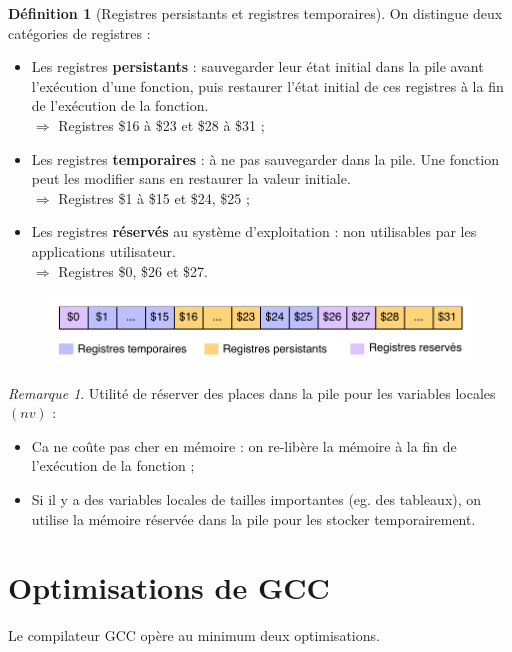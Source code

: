 \documentclass[11pt,english,french]{scrreprt}
\theoremstyle{remark}
\newtheorem*{rem*}{Remarque}
\theoremstyle{definition}
\newtheorem*{def*}{Définition}
\begin{document}
\begin{def*}[Registres persistants et registres temporaires]
	On distingue deux catégories de registres :\begin{itemize}
		\item Les registres \textbf{persistants} : sauvegarder leur état initial dans la pile avant l'exécution d'une fonction, puis restaurer l'état initial de ces registres à la fin de l'exécution de la fonction.\\
		$\Rightarrow$ Registres \$16 à \$23 et \$28 à \$31 ;
		\item Les registres \textbf{temporaires} : à ne pas sauvegarder dans la pile. Une fonction peut les modifier sans en restaurer la valeur initiale.\\
		$\Rightarrow$ Registres \$1 à \$15 et \$24, \$25 ;
		\item Les registres \textbf{réservés} au système d'exploitation : non utilisables par les applications utilisateur.\\
		$\Rightarrow$ Registres \$0, \$26 et \$27.
	\end{itemize}
	\begin{figure}[!h]
		\vspace{-10pt}
		\center
		\includegraphics[scale=.5]{diagrammes/registres}
		\vspace{-15pt}
	\end{figure}
\end{def*}

\begin{rem*}
	Utilité de réserver des places dans la pile pour les variables locales $(nv)$ :\begin{itemize}
		\item Ca ne coûte pas cher en mémoire : on re-libère la mémoire à la fin de l'exécution de la fonction ;
		\item Si il y a des variables locales de tailles importantes (eg. des tableaux), on utilise la mémoire réservée dans la pile pour les stocker temporairement.
	\end{itemize}
\end{rem*}

\section{Optimisations de GCC} %
Le compilateur GCC opère au minimum deux optimisations.
\end{document}
